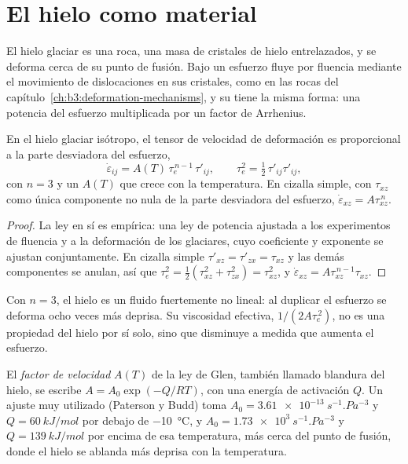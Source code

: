 \section{El hielo como material}\label{sec:b3:glaciology:material}

El hielo glaciar es una roca, una masa de cristales de hielo entrelazados, y se deforma
cerca de su punto de fusión. Bajo un esfuerzo fluye por fluencia mediante el
movimiento de dislocaciones en sus cristales, como en las rocas
del capítulo~\ref{ch:b3:deformation-mechanisms}, y su  tiene la misma
forma: una potencia del esfuerzo multiplicada por un factor de Arrhenius.

\begin{theorem}\label{thm:b3:glaciology:glen}
En el hielo glaciar isótropo, el tensor de velocidad de deformación es proporcional a la
parte desviadora del esfuerzo,
\[
\dot\varepsilon_{ij} = A(T)\,\tau_e^{\,n-1}\,\tau'_{ij}, \qquad
\tau_e^2 = \tfrac12\,\tau'_{ij}\tau'_{ij},
\]
con $n = 3$ y un  $A(T)$ que crece con la temperatura. En cizalla
simple, con $\tau_{xz}$ como única componente no nula de la parte desviadora del esfuerzo,
$\dot\varepsilon_{xz} = A\tau_{xz}^{\,n}$.
\end{theorem}

\begin{proof}
La ley en sí es empírica: una ley de potencia ajustada a los experimentos de fluencia y a la
deformación de los glaciares, cuyo coeficiente y exponente se ajustan
conjuntamente. En cizalla simple $\tau'_{xz} = \tau'_{zx} = \tau_{xz}$ y las demás
componentes se anulan, así que $\tau_e^2 = \tfrac12(\tau_{xz}^2 +
\tau_{zx}^2) = \tau_{xz}^2$, y $\dot\varepsilon_{xz} = A\tau_{xz}^{\,n-1}
\tau_{xz}$.
\end{proof}

Con $n = 3$, el hielo es un fluido fuertemente no lineal: al duplicar el esfuerzo se deforma
ocho veces más deprisa. Su viscosidad efectiva, $1/(2A\tau_e^{\,2})$, no es una propiedad
del hielo por sí solo, sino que disminuye a medida que aumenta el esfuerzo.

\begin{definition}\label{def:b3:glaciology:glen}
El \emph{factor de velocidad} $A(T)$ de la ley de Glen,
también llamado blandura del hielo, se escribe $A = A_0\exp(-Q/RT)$, con una energía de
activación $Q$. Un ajuste muy utilizado (Paterson y Budd) toma $A_0 =
\qty{3.61e-13}{s^{-1}.Pa^{-3}}$ y $Q = \qty{60}{kJ/mol}$ por debajo de
\qty{-10}{\celsius}, y $A_0 = \qty{1.73e3}{s^{-1}.Pa^{-3}}$ y $Q =
\qty{139}{kJ/mol}$ por encima de esa temperatura, más cerca del punto de fusión, donde el hielo
se ablanda más deprisa con la temperatura.
\end{definition}

